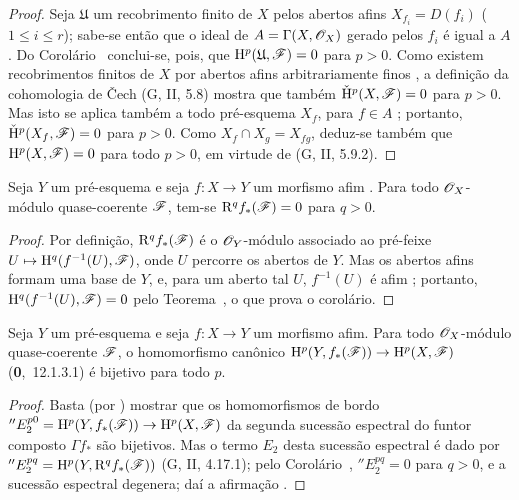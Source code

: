 \begin{proof}
Seja $\mathfrak{U}$ um recobrimento finito de $X$ pelos abertos afins $X_{f_i}=D(f_i)$ ($1\leq i\leq r$); sabe-se então que o ideal de $A=\Gamma(X,\mathscr{O}_X)$ gerado pelos $f_i$ é igual a $A$.
Do Corolário~ conclui-se, pois, que $\mathrm{H}^p(\mathfrak{U},\mathscr{F})=0$ para $p>0$.
Como existem recobrimentos finitos de $X$ por abertos afins arbitrariamente finos , a definição da cohomologia de \v Cech (G, II, 5.8) mostra que também $\check{\mathrm{H}}^p(X,\mathscr{F})=0$ para $p>0$.
Mas isto se aplica também a todo pré-esquema $X_f$, para $f\in A$ ; portanto, $\check{\mathrm{H}}^p(X_f,\mathscr{F})=0$ para $p>0$.
Como $X_f\cap X_g=X_{fg}$, deduz-se também que $\mathrm{H}^p(X,\mathscr{F})=0$ para todo $p>0$, em virtude de (G, II, 5.9.2).
\end{proof}

\begin{corollary}[1.3.2]
\label{III.1.3.2}
Seja $Y$ um pré-esquema e seja $f:X\to Y$ um morfismo afim .
Para todo $\mathscr{O}_X$-módulo quase-coerente $\mathscr{F}$, tem-se $\mathrm{R}^q f_*(\mathscr{F})=0$ para $q>0$.
\end{corollary}

\begin{proof}
Por definição, $\mathrm{R}^q f_*(\mathscr{F})$ é o $\mathscr{O}_Y$-módulo associado ao pré-feixe $U\mapsto\HH^q(f^{-1}(U),\sh{F})$, onde $U$ percorre os abertos de $Y$.
Mas os abertos afins formam uma base de $Y$, e, para um aberto tal $U$, $f^{-1}(U)$ é afim ; portanto, $\mathrm{H}^q(f^{-1}(U),\mathscr{F})=0$ pelo Teorema~, o que prova o corolário.
\end{proof}

\begin{corollary}[1.3.3]
\label{III.1.3.3}
Seja $Y$ um pré-esquema e seja $f:X\to Y$ um morfismo afim.
Para todo $\mathscr{O}_X$-módulo quase-coerente $\mathscr{F}$, o homomorfismo canônico $\HH^p(Y,f_*(\sh{F}))\to\HH^p(X,\sh{F})$ (\textbf{0},~12.1.3.1) é bijetivo para todo $p$.
\end{corollary}

\begin{proof}
Basta (por ) mostrar que os homomorfismos de bordo $''E_2^{p0}=\HH^p(Y,f_*(\sh{F}))\to\HH^p(X,\sh{F})$ da segunda sucessão espectral do funtor composto $\Gamma f_*$ são bijetivos.
Mas o termo $E_2$ desta sucessão espectral é dado por $''E_2^{pq}=\mathrm{H}^p(Y,\mathrm{R}^q f_*(\mathscr{F}))$ (G, II, 4.17.1); pelo Corolário~, $''E_2^{pq}=0$ para $q>0$, e a sucessão espectral degenera; daí a afirmação .
\end{proof}

